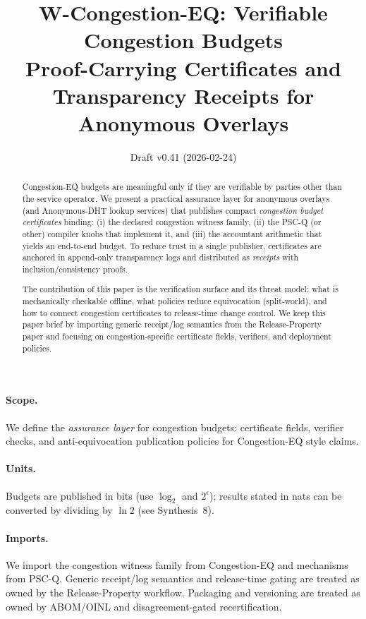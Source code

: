 \documentclass[11pt]{article}
\title{W-Congestion-EQ: Verifiable Congestion Budgets\\
Proof-Carrying Certificates and Transparency Receipts for Anonymous Overlays}
\author{}
\date{Draft v0.41 (2026-02-24)}
\begin{document}
\maketitle

\begin{abstract}
Congestion-EQ budgets are meaningful only if they are verifiable by parties other than the service operator.
We present a practical assurance layer for anonymous overlays (and Anonymous-DHT lookup services) that publishes compact \emph{congestion budget certificates} binding: (i) the declared congestion witness family, (ii) the PSC-Q (or other) compiler knobs that implement it, and (iii) the accountant arithmetic that yields an end-to-end budget.
To reduce trust in a single publisher, certificates are anchored in append-only transparency logs and distributed as \emph{receipts} with inclusion/consistency proofs.

The contribution of this paper is the verification surface and its threat model: what is mechanically checkable offline, what policies reduce equivocation (split-world), and how to connect congestion certificates to release-time change control.
We keep this paper brief by importing generic receipt/log semantics from the Release-Property paper and focusing on congestion-specific certificate fields, verifiers, and deployment policies.
\end{abstract}

\paragraph{Scope.}
We define the \emph{assurance layer} for congestion budgets: certificate fields, verifier checks, and anti-equivocation publication policies for Congestion-EQ style claims.

\paragraph{Units.} Budgets are published in bits (use $\log_2$ and $2^{\epsilon}$); results stated in nats can be converted by dividing by $\ln 2$ (see Synthesis~8).\cite{series:notation}

\paragraph{Imports.}
We import the congestion witness family from Congestion-EQ and mechanisms from PSC-Q.\cite{series:congeq,series:pscq}
Generic receipt/log semantics and release-time gating are treated as owned by the Release-Property workflow.\cite{series:release}
Packaging and versioning are treated as owned by ABOM/OINL and disagreement-gated recertification.\cite{series:abom,series:recert}
\end{document}
